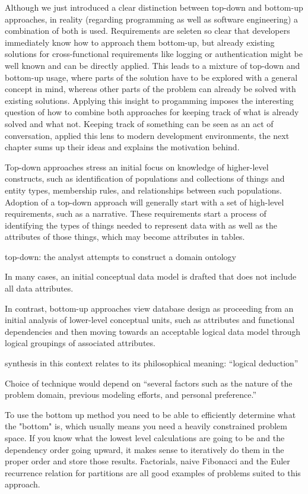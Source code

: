 %
Although we just introduced a clear distinction between top-down and bottom-up approaches, in reality (regarding programming as well as software engineering) a combination of both is used.
Requirements are seleten so clear that developers immediately know how to approach them bottom-up, but already existing solutions for cross-functional requirements like logging or authentication might be well known and can be directly applied.
This leads to a mixture of top-down and bottom-up usage, where parts of the solution have to be explored with a general concept in mind, whereas other parts of the problem can already be solved with existing solutions.
Applying this insight to progamming imposes the interesting question of how to combine both approaches for keeping track of what is already solved and what not.
Keeping track of something can be seen as an act of conversation, \citeauthor{mccabe_towards_2023} applied this lens to modern development environments, the next chapter sums up their ideas and explains the motivation behind.


\cite{kung_comparing_2013}
Top-down approaches stress an initial focus on knowledge of higher-level constructs, such as identification of populations and collections of things and entity types, membership rules, and relationships between such populations. Adoption of a top-down approach will generally start with a set of high-level requirements, such as a narrative. These requirements start a process of identifying the types of things needed to represent data with as well as the attributes of those things, which may become attributes in tables.

top-down: the analyst attempts to construct a domain ontology

In many cases, an initial conceptual data model is drafted that does not include all data attributes.

In contrast, bottom-up approaches view database design as proceeding from an initial analysis of lower-level conceptual units, such as attributes and functional dependencies and then moving towards an acceptable logical data model through logical groupings of associated attributes.

synthesis in this context relates to its philosophical meaning: “logical deduction”

Choice of technique would depend on “several factors such as the nature of the problem domain, previous modeling efforts, and personal preference.”

\cite{jones_is_2011}
To use the bottom up method you need to be able to efficiently determine what the "bottom" is, which usually means you need a heavily constrained problem space. If you know what the lowest level calculations are going to be and the dependency order going upward, it makes sense to iteratively do them in the proper order and store those results. Factorials, naive Fibonacci and the Euler recurrence relation for partitions are all good examples of problems suited to this approach.

